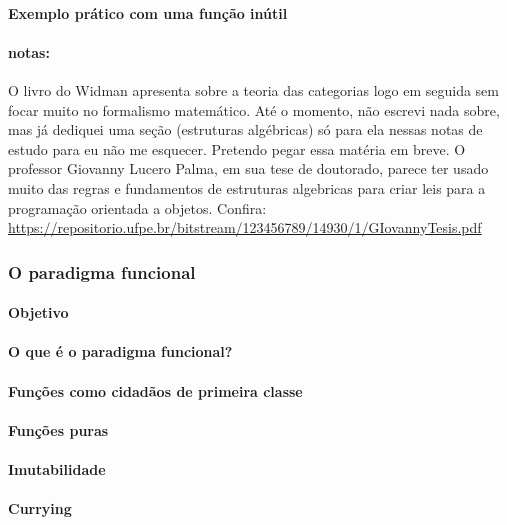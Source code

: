 \documentclass[a4paper,12pt]{article}
\begin{document}
\paragraph{Exemplo prático com uma função inútil}


% 
% 
% 
% 


\paragraph{notas: } O livro do Widman apresenta sobre a teoria das categorias logo em seguida sem focar muito no formalismo matemático. Até o momento, não escrevi nada sobre, mas já dediquei uma seção (estruturas algébricas) só para ela nessas notas de estudo para eu não me esquecer. Pretendo pegar essa 
matéria em breve. O professor Giovanny Lucero Palma, em sua tese de doutorado, parece ter usado muito das regras e fundamentos de estruturas algebricas para criar leis para a programação orientada a objetos. Confira: \url{https://repositorio.ufpe.br/bitstream/123456789/14930/1/GIovannyTesis.pdf}


\subsubsection{O paradigma funcional} %

\paragraph{Objetivo}
\paragraph{O que é o paradigma funcional?}
\paragraph{Funções como cidadãos de primeira classe}
\paragraph{Funções puras}
\paragraph{Imutabilidade}
\paragraph{Currying}
\end{document}
